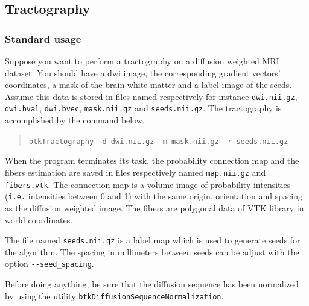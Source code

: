 \subsection{Tractography \cite{pontabry_probabilistic_2011}}
\label{subsec:tracto}

    \subsubsection*{Standard usage}
        Suppose you want to perform a tractography on a diffusion weighted MRI 
dataset. You should have a dwi image, the corresponding gradient vectors'
coordinates, a mask of the brain white matter and a label image of the seeds.
Assume this data is stored in files named respectively for instance
\texttt{dwi.nii.gz}, \texttt{dwi.bval}, \texttt{dwi.bvec}, \texttt{mask.nii.gz} and
\texttt{seeds.nii.gz}. The tractography is accomplished by the command below.
            \begin{quote}
                \texttt{btkTractography -d dwi.nii.gz -m mask.nii.gz -r seeds.nii.gz}
            \end{quote}
        When the program terminates its task, the probability connection map and
        the fibers estimation are saved in files respectively named
\texttt{map.nii.gz} and \texttt{fibers.vtk}. The connection map is a volume
image of probability intensities (\texttt{i.e.} intensities between 0 and 1)
with the same origin, orientation and spacing as the diffusion weighted image.
The fibers are polygonal data of VTK library in world coordinates.

        The file named \texttt{seeds.nii.gz} is a label map which is used to 
        generate seeds for the algorithm. The spacing in millimeters between
seeds can be adjust with the option \texttt{-\hspace{0.1mm}-seed\_spacing}.

        Before doing anything, be sure that the diffusion sequence has been normalized by using the utility \texttt{btkDiffusionSequenceNormalization}.
        
